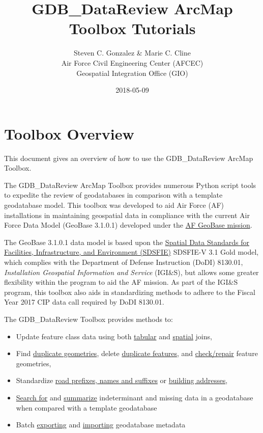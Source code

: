 \documentclass[openany]{book}
\title{GDB\_DataReview ArcMap Toolbox Tutorials}
\author{Steven C. Gonzalez \& Marie C. Cline \\ Air Force Civil Engineering Center (AFCEC) \\ Geospatial Integration Office (GIO)}
\date{2018-05-09}
\providecommand{\tightlist}{%
  \setlength{\itemsep}{0pt}\setlength{\parskip}{0pt}}
\theoremstyle{definition}
\theoremstyle{definition}
\theoremstyle{definition}
\theoremstyle{remark}
\begin{document}
\maketitle

{
\setcounter{tocdepth}{0}
\tableofcontents
}
\mainmatter

\chapter{Toolbox Overview}\label{overview}

This document gives an overview of how to use the GDB\_DataReview ArcMap
Toolbox.

The GDB\_DataReview ArcMap Toolbox provides numerous Python script tools
to expedite the review of geodatabases in comparison with a template
geodatabase model. This toolbox was developed to aid Air Force (AF)
installations in maintaining geospatial data in compliance with the
current Air Force Data Model (GeoBase 3.1.0.1) developed under the
\href{https://www.sdsfieonline.org/Components/USAF}{AF GeoBase mission}.

The GeoBase 3.1.0.1 data model is based upon the
\href{https://www.sdsfieonline.org/}{Spatial Data Standards for
Facilities, Infrastructure, and Environment (SDSFIE)} SDSFIE-V 3.1 Gold
model, which complies with the Department of Defense Instruction (DoDI)
8130.01, \emph{Installation Geospatial Information and Service}
(IGI\&S), but allows some greater flexibility within the program to aid
the AF mission. As part of the IGI\&S program, this toolbox also aids in
standardizing methods to adhere to the Fiscal Year 2017 CIP data call
required by DoDI 8130.01.

The GDB\_DataReview Toolbox provides methods to:

\begin{itemize}
\tightlist
\item
  Update feature class data using both
  \protect\hyperlink{joinCalc}{tabular} and
  \protect\hyperlink{spatjoinCalc}{spatial} joins,
\item
  Find \protect\hyperlink{dupGeom}{duplicate geometries}, delete
  \protect\hyperlink{dupFeats}{duplicate features}, and
  \protect\hyperlink{chkGeom}{check/repair} feature geometries,
\item
  Standardize \protect\hyperlink{std3}{road prefixes, names and
  suffixes} or \protect\hyperlink{stdAdd1}{building addresses},
\item
  \protect\hyperlink{indtSearch}{Search for} and
  \protect\hyperlink{summIndt}{summarize} indeterminant and missing data
  in a geodatabase when compared with a template geodatabase
\item
  Batch \protect\hyperlink{exMeta}{exporting} and
  \protect\hyperlink{imMeta}{importing} geodatabase metadata
\end{itemize}
\end{document}
